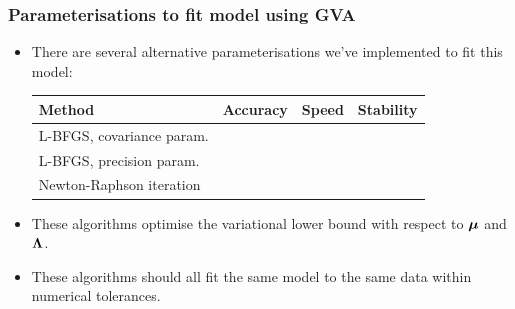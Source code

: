 \documentclass{beamer}
\begin{document}
	\begin{frame}
		\frametitle{Parameterisations to fit model using GVA}
		\begin{itemize}
			\item There are several \mbox{alternative} parameterisations we've implemented
			      to fit this model:
			      \begin{tabular}{|l|ccc|}
			      	\hline
			      	Method                    & Accuracy   & Speed      & Stability  \\
			      	\hline
			      	L-BFGS, covariance param. & \checkmark &            & \checkmark \\
			      	L-BFGS, precision param.  & \checkmark & \checkmark & \checkmark \\
			      	Newton-Raphson iteration  & \checkmark & \checkmark &            \\
			      	\hline
			      \end{tabular}	
			\item These algorithms optimise the variational lower bound with respect to
			      ${\boldsymbol \mu}$ and ${\boldsymbol \Lambda}$.
			\item These algorithms should all fit the same model to the same data
			      within numerical tolerances.
		\end{itemize}
	\end{frame}
			
\end{document}
